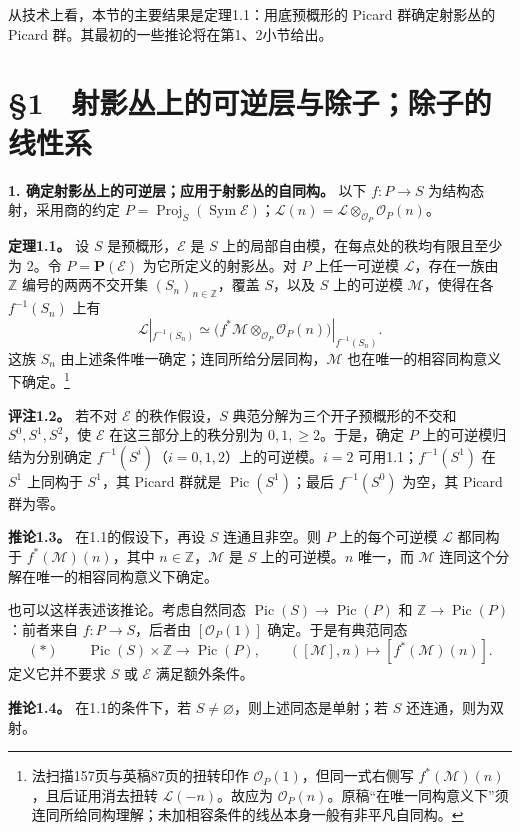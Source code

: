\documentclass[openany,fontset=fandol]{ctexbook}
\newcommand{\OO}{\mathcal O}
\newcommand{\LL}{\mathcal L}
\newcommand{\MM}{\mathcal M}
\newcommand{\EE}{\mathcal E}
\DeclareMathOperator{\Pic}{Pic}
\DeclareMathOperator{\Sym}{Sym}
\DeclareMathOperator{\Proj}{Proj}
\begin{document}
从技术上看，本节的主要结果是定理1.1：用底预概形的 Picard 群确定射影丛的 Picard 群。其最初的一些推论将在第1、2小节给出。

\section*{§1　射影丛上的可逆层与除子；除子的线性系}
\noindent\textbf{1. 确定射影丛上的可逆层；应用于射影丛的自同构。}
以下 \(f:P\to S\) 为结构态射，采用商的约定 \(P=\Proj_S(\Sym \EE)\)；\(\LL(n)=\LL\otimes_{\OO_P}\OO_P(n)\)。

\medskip\noindent\textbf{定理1.1。}
设 \(S\) 是预概形，\(\EE\) 是 \(S\) 上的局部自由模，在每点处的秩均有限且至少为 \(2\)。令 \(P=\mathbf P(\EE)\) 为它所定义的射影丛。对 \(P\) 上任一可逆模 \(\LL\)，存在一族由 \(\mathbb Z\) 编号的两两不交开集 \((S_n)_{n\in\mathbb Z}\)，覆盖 \(S\)，以及 \(S\) 上的可逆模 \(\MM\)，使得在各 \(f^{-1}(S_n)\) 上有
\[
\LL|_{f^{-1}(S_n)}
  \simeq \bigl(f^*\MM\otimes_{\OO_P}\OO_P(n)\bigr)|_{f^{-1}(S_n)} .
\]
这族 \(S_n\) 由上述条件唯一确定；连同所给分层同构，\(\MM\) 也在唯一的相容同构意义下确定。\footnote{法扫描157页与英稿87页的扭转印作 \(\OO_P(1)\)，但同一式右侧写 \(f^*(\MM)(n)\)，且后证用消去扭转 \(\LL(-n)\)。故应为 \(\OO_P(n)\)。原稿“在唯一同构意义下”须连同所给同构理解；未加相容条件的线丛本身一般有非平凡自同构。}

\medskip\noindent\textbf{评注1.2。}
若不对 \(\EE\) 的秩作假设，\(S\) 典范分解为三个开子预概形的不交和 \(S^0,S^1,S^2\)，使 \(\EE\) 在这三部分上的秩分别为 \(0,1,\ge 2\)。于是，确定 \(P\) 上的可逆模归结为分别确定 \(f^{-1}(S^i)\)（\(i=0,1,2\)）上的可逆模。\(i=2\) 可用1.1；\(f^{-1}(S^1)\) 在 \(S^1\) 上同构于 \(S^1\)，其 Picard 群就是 \(\Pic(S^1)\)；最后 \(f^{-1}(S^0)\) 为空，其 Picard 群为零。

\medskip\noindent\textbf{推论1.3。}
在1.1的假设下，再设 \(S\) 连通且非空。则 \(P\) 上的每个可逆模 \(\LL\) 都同构于 \(f^*(\MM)(n)\)，其中 \(n\in\mathbb Z\)，\(\MM\) 是 \(S\) 上的可逆模。\(n\) 唯一，而 \(\MM\) 连同这个分解在唯一的相容同构意义下确定。

也可以这样表述该推论。考虑自然同态 \(\Pic(S)\to\Pic(P)\) 和 \(\mathbb Z\to\Pic(P)\)：前者来自 \(f:P\to S\)，后者由 \([\OO_P(1)]\) 确定。于是有典范同态
\[
(*)\qquad
\Pic(S)\times\mathbb Z\longrightarrow\Pic(P),\qquad
([\MM],n)\longmapsto[f^*(\MM)(n)] .
\]
定义它并不要求 \(S\) 或 \(\EE\) 满足额外条件。

\medskip\noindent\textbf{推论1.4。}
在1.1的条件下，若 \(S\ne\varnothing\)，则上述同态是单射；若 \(S\) 还连通，则为双射。
\end{document}
